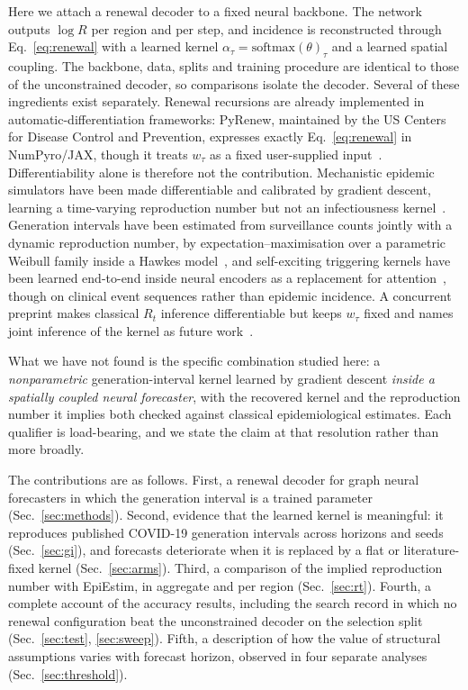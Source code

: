 \documentclass[10pt,letterpaper]{article}
\newcommand{\Rt}{\ensuremath{R_t}\xspace}
\begin{document}
Here we attach a renewal decoder to a fixed neural backbone. The network
outputs $\log R$ per region and per step, and incidence is reconstructed
through Eq.~\eqref{eq:renewal} with a learned kernel
$\alpha_\tau=\mathrm{softmax}(\theta)_\tau$ and a learned spatial coupling.
The backbone, data, splits and training procedure are identical to those of
the unconstrained decoder, so comparisons isolate the decoder. Several of these ingredients exist separately. Renewal
recursions are already implemented in automatic-differentiation frameworks:
PyRenew, maintained by the US Centers for Disease Control and Prevention,
expresses exactly Eq.~\eqref{eq:renewal} in NumPyro/JAX, though it treats
$w_\tau$ as a fixed user-supplied input~\cite{cdc2024pyrenew}. Differentiability
alone is therefore not the contribution. Mechanistic epidemic simulators have
been made differentiable and calibrated by gradient descent, learning a
time-varying reproduction number but not an infectiousness
kernel~\cite{chopra2023gradabm}. Generation intervals have been estimated from
surveillance counts jointly with a dynamic reproduction number, by
expectation--maximisation over a parametric Weibull family inside a Hawkes
model~\cite{chiang2022hawkes}, and self-exciting triggering kernels have been
learned end-to-end inside neural encoders as a replacement for
attention~\cite{isik2023hawkes,turkmen2021deep}, though on clinical event
sequences rather than epidemic incidence. A concurrent preprint makes classical
\Rt inference differentiable but keeps $w_\tau$ fixed and names joint inference
of the kernel as future work~\cite{cirl2026conditional}.

What we have not found is the specific combination studied here: a
\emph{nonparametric} generation-interval kernel learned by gradient descent
\emph{inside a spatially coupled neural forecaster}, with the recovered kernel
and the reproduction number it implies both checked against classical
epidemiological estimates. Each qualifier is load-bearing, and we state the
claim at that resolution rather than more broadly.

The contributions are as follows. First, a renewal decoder for graph neural
forecasters in which the generation interval is a trained parameter
(Sec.~\ref{sec:methods}). Second, evidence that the learned kernel is
meaningful: it reproduces published COVID-19 generation intervals across
horizons and seeds (Sec.~\ref{sec:gi}), and forecasts deteriorate when it is
replaced by a flat or literature-fixed kernel (Sec.~\ref{sec:arms}). Third, a
comparison of the implied reproduction number with EpiEstim, in aggregate and
per region (Sec.~\ref{sec:rt}). Fourth, a complete account of the accuracy
results, including the search record in which no renewal configuration beat
the unconstrained decoder on the selection split (Sec.~\ref{sec:test},
\ref{sec:sweep}). Fifth, a description of how the value of structural
assumptions varies with forecast horizon, observed in four separate analyses
(Sec.~\ref{sec:threshold}).
\end{document}
